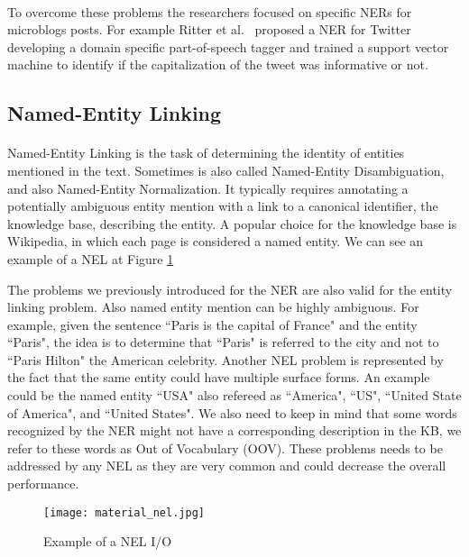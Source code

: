 \paragraph{}
To overcome these problems the researchers focused on specific NERs for microblogs posts. For example Ritter et al.~\cite{ritter2011named} proposed a NER for Twitter developing a domain specific part-of-speech tagger and trained a support vector machine to identify if the capitalization of the tweet was informative or not. 

\subsection{Named-Entity Linking}
\paragraph{}
Named-Entity Linking is the task of determining the identity of entities mentioned in the text. Sometimes is also called Named-Entity Disambiguation, and also Named-Entity Normalization. It typically requires annotating a potentially ambiguous entity mention with a link to a canonical identifier, the knowledge base, describing the entity. A popular choice for the knowledge base is Wikipedia, in which each page is considered a named entity. We can see an example of a NEL at Figure \ref{fig:nel_io} 


The problems we previously introduced for the NER are also valid for the entity linking problem. Also named entity mention can be highly ambiguous. For example, given the sentence ``Paris is the capital of France" and the entity ``Paris", the idea is to determine that ``Paris" is referred to the city and not to ``Paris Hilton" the American celebrity. Another NEL problem is represented by the fact that the same entity could have multiple surface forms. An example could be the named entity ``USA" also refereed as ``America", ``US", ``United State of America", and ``United States". We also need to keep in mind that some words recognized by the NER might not have a corresponding description in the KB, we refer to these words as Out of Vocabulary (OOV). These problems needs to be addressed by any NEL as they are very common and could decrease the overall performance.

\vspace{-10pt}
\begin{figure}[ht]
\texttt{[image: material\_nel.jpg]}
\caption{Example of a NEL I/O}
\label{fig:nel_io}
\end{figure}
\vspace{-10pt}



